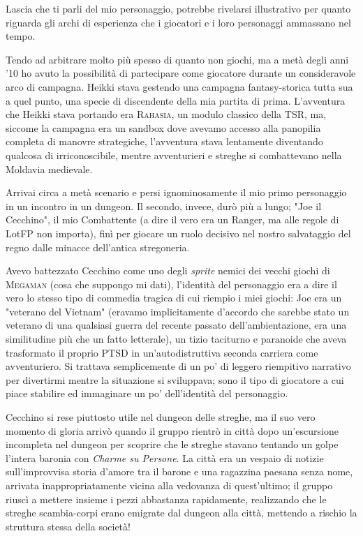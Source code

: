 
Lascia che ti parli del mio personaggio, potrebbe rivelarsi illustrativo per quanto riguarda gli archi di esperienza che i giocatori e i loro personaggi ammassano nel tempo.

Tendo ad arbitrare molto più spesso di quanto non giochi, ma a metà degli anni '10 ho avuto la possibilità di partecipare come giocatore durante un consideravole arco di campagna. Heikki stava gestendo una campagna fantasy-storica tutta sua a quel punto, una specie di discendente della mia partita di prima. L'avventura che Heikki stava portando era \textsc{Rahasia}, un modulo classico della TSR, ma, siccome la campagna era un sandbox dove avevamo accesso alla panopilia completa di manovre strategiche, l'avventura stava lentamente diventando qualcosa di irriconoscibile, mentre avventurieri e streghe si combattevano nella Moldavia medievale.

Arrivai circa a metà scenario e persi ignominosamente il mio primo personaggio in un incontro in un dungeon. Il secondo, invece, durò più a lungo; "Joe il Cecchino", il mio Combattente (a dire il vero era un Ranger, ma alle regole di LotFP non importa), finì per giocare un ruolo decisivo nel nostro salvataggio del regno dalle minacce dell'antica stregoneria.

Avevo battezzato Cecchino come uno degli \textit{sprite} nemici dei vecchi giochi di \textsc{Megaman} (cosa che suppongo mi dati), l'identità del personaggio era a dire il vero lo stesso tipo di commedia tragica di cui riempio i miei giochi: Joe era un "veterano del Vietnam" (eravamo implicitamente d'accordo che sarebbe stato un veterano di una qualsiasi guerra del recente passato dell'ambientazione, era una similitudine più che un fatto letterale), un tizio taciturno e paranoide che aveva trasformato il proprio PTSD in un'autodistruttiva seconda carriera come avventuriero. Si trattava semplicemente di un po' di leggero riempitivo narrativo per divertirmi mentre la situazione si sviluppava; sono il tipo di giocatore a cui piace stabilire ed immaginare un po' dell'identità del personaggio.

Cecchino si rese piuttosto utile nel dungeon delle streghe, ma il suo vero momento di gloria arrivò quando il gruppo rientrò in città dopo un'escursione incompleta nel dungeon per scoprire che le streghe stavano tentando un golpe l'intera baronia con \textit{Charme su Persone}. La città era un vespaio di notizie sull'improvvisa storia d'amore tra il barone e una ragazzina paesana senza nome, arrivata inappropriatamente vicina alla vedovanza di quest'ultimo; il gruppo riuscì a mettere insieme i pezzi abbastanza rapidamente, realizzando che le streghe scambia-corpi erano emigrate dal dungeon alla città, mettendo a rischio la struttura stessa della società!

